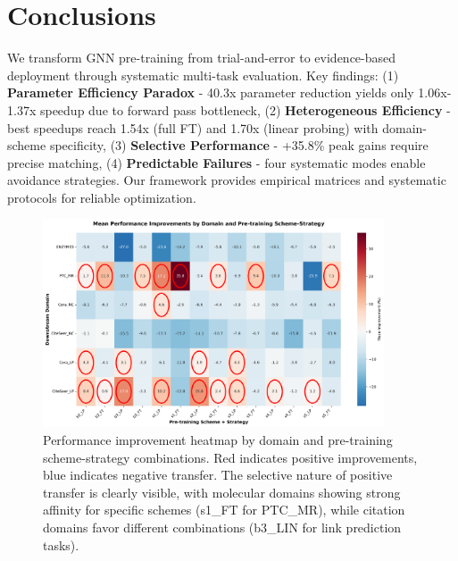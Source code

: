 \documentclass[11pt]{article}
\begin{document}
\section{Conclusions}

We transform GNN pre-training from trial-and-error to evidence-based deployment through systematic multi-task evaluation. Key findings: (1) \textbf{Parameter Efficiency Paradox} - 40.3x parameter reduction yields only 1.06x-1.37x speedup due to forward pass bottleneck, (2) \textbf{Heterogeneous Efficiency} - best speedups reach 1.54x (full FT) and 1.70x (linear probing) with domain-scheme specificity, (3) \textbf{Selective Performance} - +35.8\% peak gains require precise matching, (4) \textbf{Predictable Failures} - four systematic modes enable avoidance strategies. Our framework provides empirical matrices and systematic protocols for reliable optimization.



\begin{figure}[!ht]
\centering
\includegraphics[width=0.9\textwidth]{domain_performance_heatmap.png}
\caption{Performance improvement heatmap by domain and pre-training scheme-strategy combinations. Red indicates positive improvements, blue indicates negative transfer. The selective nature of positive transfer is clearly visible, with molecular domains showing strong affinity for specific schemes (s1\_FT for PTC\_MR), while citation domains favor different combinations (b3\_LIN for link prediction tasks).}
\label{fig:domain-heatmap}
\end{figure}
\end{document}
